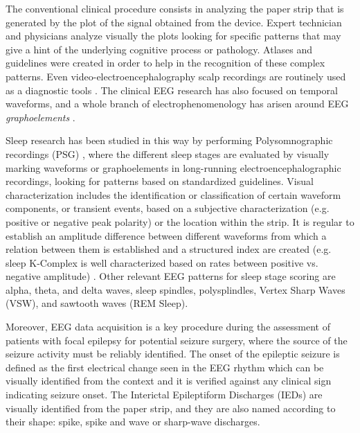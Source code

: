 The conventional clinical procedure consists in analyzing the paper strip that is generated by the plot of the signal obtained from the device.  Expert technician and physicians analyze visually the plots looking for specific patterns that may give a hint of the underlying cognitive process or pathology.   Atlases and guidelines were created in order to help in the recognition of these complex patterns.   Even video-electroencephalography scalp recordings are routinely used as a diagnostic tools \cite{Giagante2003} .  The clinical EEG research has also focused on temporal waveforms, and a whole branch of electrophenomenology has arisen around EEG \textit{graphoelements} \cite{Schomer2010}.  

Sleep research has been studied in this way by performing Polysomnographic recordings (PSG)  \cite{Rodenbeck2006}, where the different sleep stages are evaluated by visually marking waveforms or graphoelements in long-running electroencephalographic recordings, looking for patterns based on standardized guidelines.   Visual characterization includes the identification or classification of certain waveform components, or transient events, based on a subjective characterization (e.g. positive or negative peak polarity) or the location within the strip.  It is regular to establish an amplitude difference between different waveforms from which a relation between them is established and a structured index are created (e.g. sleep K-Complex is well characterized based on rates between positive vs. negative amplitude) \cite{Uchida1999}.  Other relevant EEG patterns for sleep stage scoring are alpha, theta, and delta waves,  sleep spindles, polysplindles, Vertex Sharp Waves (VSW), and sawtooth waves (REM Sleep).

Moreover, EEG data acquisition is a key procedure during the assessment of patients with focal epilepsy for potential seizure surgery, where the source of the seizure activity must be reliably identified. The onset of the epileptic seizure is defined as the first electrical change seen in the EEG rhythm which can be visually identified from the context and it is verified against any clinical sign indicating seizure onset.  The Interictal Epileptiform Discharges (IEDs) are visually identified from the paper strip, and they are also named according to their shape: spike, spike and wave or sharp-wave discharges\cite{EEGIntro}.  

